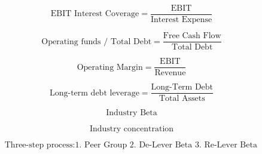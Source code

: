 \documentclass{article}
\begin{document}
\noindent%
\begin{mdframed}[backgroundcolor=white!30] %
\[
\text{EBIT Interest Coverage} = \frac{\text{EBIT}}{\text{Interest Expense}}
\]
\end{mdframed}

\noindent%
\begin{mdframed}[backgroundcolor=white!30] %
\[
    \text{Operating funds / Total Debt} = \frac{\text{Free Cash Flow}}{\text{Total Debt}}
\]
\end{mdframed}

\noindent%
\begin{mdframed}[backgroundcolor=white!30] %
\[
    \text{Operating Margin} = \frac{\text{EBIT}}{\text{Revenue}}
\]
\end{mdframed}

\noindent%
\begin{mdframed}[backgroundcolor=white!30] %
\[
    \text{Long-term debt leverage} = \frac{\text{Long-Term Debt}}{\text{Total Assets}}
\]
\end{mdframed}

\noindent%
\begin{mdframed}[backgroundcolor=white!30] %
\[
    \text{Industry Beta}
\]
\end{mdframed}

\noindent%
\begin{mdframed}[backgroundcolor=white!30] %
\[
    \text{Industry concentration}
\]
\end{mdframed}

\noindent%
\begin{mdframed}[backgroundcolor=white!30] %
\[
    \text{Three-step process} : \text{1. Peer Group 2. De-Lever Beta 3. Re-Lever Beta}
\]
\end{mdframed}
\end{document}
